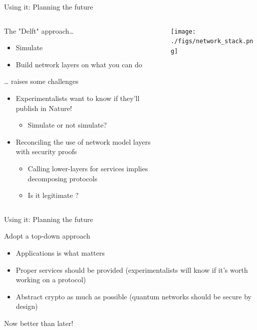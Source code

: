 \documentclass[presentation]{beamer}
\begin{document}
\begin{frame}[label={sec:org424f4d6}]{Using it: Planning the future}
\begin{columns}
\begin{column}{.6\columnwidth}
\begin{block}{The "Delft" approach\ldots{}}
\begin{itemize}
\item Simulate
\item Build network layers on what you can do
\end{itemize}
\end{block}

\begin{block}{\ldots{} raises some challenges}
\begin{itemize}
\item Experimentalists want to know if they'll publish in Nature!
\begin{itemize}
\item Simulate or not simulate?
\end{itemize}
\item Reconciling the use of network model layers with security proofs
\begin{itemize}
\item Calling lower-layers for services implies decomposing protocols
\item Is it legitimate ?
\end{itemize}
\end{itemize}
\end{block}
\end{column}

\begin{column}{.4\columnwidth}
\begin{center}
\texttt{[image: ./figs/network\_stack.png]}
\end{center}
\end{column}
\end{columns}
\end{frame}


\begin{frame}[label={sec:org3026cb4}]{Using it: Planning the future}
\begin{block}{Adopt a top-down approach}
\begin{itemize}
\item Applications is what matters
\item Proper services should be provided (experimentalists will know if it's worth working on a protocol)
\item Abstract crypto as much as possible (quantum networks should be secure by design)
\end{itemize}

\alert{\alert{Now better than later!}}
\end{block}
\end{frame}
\end{document}
